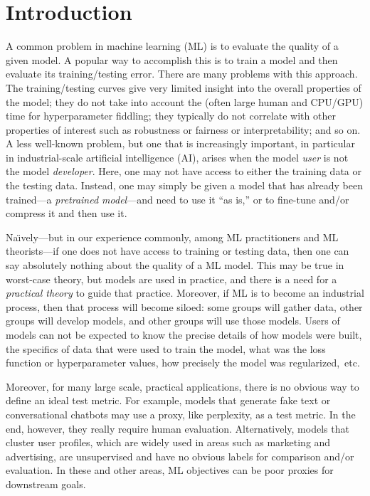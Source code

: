 \section{Introduction}
\label{sxn:intro}

A common problem in machine learning (ML) 
is to evaluate the quality of a given model.
A popular way to accomplish this
is to train a model and then evaluate its training/testing error.
There are many problems with this approach.
The training/testing curves give very limited insight into the overall properties of the model; 
they do not take into account the (often large human and CPU/GPU) time for hyperparameter fiddling;
they typically do not correlate with other properties of interest such as robustness or fairness or interpretability; 
and so on.
A less well-known problem, but one that is increasingly important, in particular in industrial-scale artificial intelligence (AI), arises when the model \emph{user} is not the model \emph{developer}.
Here, one may not have access to either the training data or the testing data.
Instead, one may simply be given a model that has already been trained---a \emph{pretrained model}---and need to use it ``as is,'' or to fine-tune and/or compress it and then use it.

Na\"{\i}vely---but in our experience commonly, among ML practitioners and ML theorists---if one does not have access to training or testing data, then one can say absolutely nothing about the quality of a ML model.
This may be true in worst-case theory, but models are used in practice, and there is a need for a \emph{practical theory} to guide that practice.
Moreover, if ML is to become an industrial process, then that process will become siloed: some groups will gather data, other groups will develop models, and other groups will use those models.
Users of models can not be expected to know the precise details of how models were built, the specifics of data that were used to train the model, what was the loss function or hyperparameter values, how precisely the model was regularized,~etc.

Moreover, for many large scale, practical applications, there is no obvious way to define an ideal test metric. 
For example, models that generate fake text or conversational chatbots may use a proxy, like perplexity, as a test metric.
In the end, however, they really require human evaluation. 
Alternatively, models that cluster user profiles, which are widely used in areas such as marketing and advertising, are unsupervised and have no obvious labels for comparison and/or evaluation.
In these and other areas, ML objectives can be poor proxies for downstream goals.

